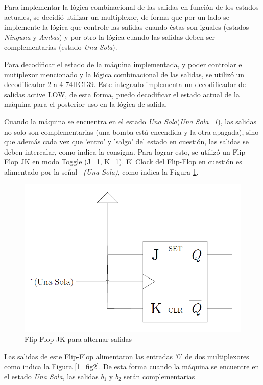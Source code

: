 Para implementar la lógica combinacional de las salidas en función de los estados actuales, se decidió utilizar un multiplexor, de forma que por un lado se implemente la lógica que controle las salidas cuando éstas son iguales (estados \emph{Ninguna} y \emph{Ambas}) y por otro la lógica cuando las salidas deben ser complementarias (estado \emph{Una Sola}).

Para decodificar el estado de la máquina implementada, y poder controlar el mutiplexor mencionado y la lógica combinacional de las salidas, se utilizó un decodificador  2-a-4 74HC139. Este integrado implementa un decodificador de salidas active LOW, de esta forma, puedo decodificar el estado actual de la máquina para el posterior uso en la lógica de salida.

Cuando la máquina se encuentra en el estado \emph{Una Sola}(\emph{Una Sola=1}), las salidas no solo son complementarias (una bomba está encendida y la otra apagada), sino que además cada vez que 'entro' y 'salgo' del estado en cuestión, las salidas se deben intercalar, como indica la consigna. Para lograr esto, se utilizó un Flip-Flop JK en modo Toggle (J=1, K=1). El Clock del Flip-Flop en cuestión es alimentado por la señal \emph{~(Una Sola)}, como indica la Figura \ref{1_fig3}.

\begin{figure}[H]
\centering
\includegraphics[scale=0.3]{images/jk_toggle_moore.png}
\caption{Flip-Flop JK para alternar salidas}
\label{1_fig3}
\end{figure}

Las salidas de este Flip-Flop alimentaron las entradas '0' de dos multiplexores como indica la Figura \ref{1_fig2}. De esta forma cuando la máquina se encuentre en el estado \emph{Una Sola}, las salidas $b_1$ y $b_2$ serán complementarias



